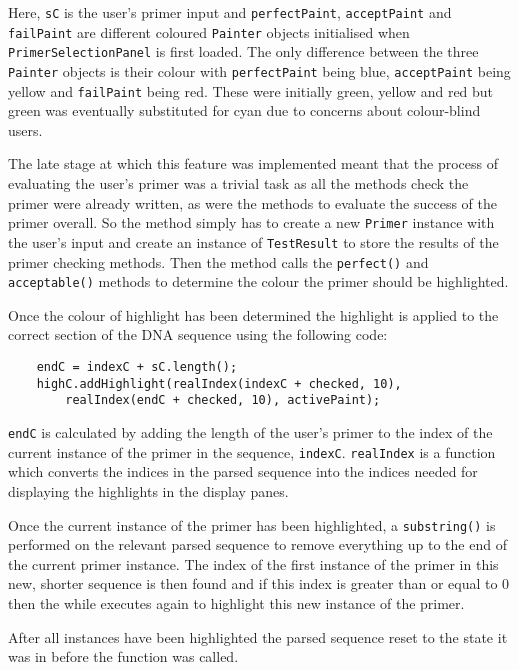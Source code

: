 Here, \texttt{sC} is the user's primer input and \texttt{perfectPaint},
\texttt{acceptPaint} and \texttt{failPaint} are different coloured
\texttt{Painter} objects initialised when \texttt{PrimerSelectionPanel}
is first loaded. The only difference between the three \texttt{Painter}
objects is their colour with \texttt{perfectPaint} being blue,
\texttt{acceptPaint} being yellow and \texttt{failPaint} being red.
These were initially green, yellow and red but green was eventually
substituted for cyan due to concerns about colour-blind users.

The late stage at which this feature was implemented meant that the
process of evaluating the user's primer was a trivial task as all the
methods check the primer were already written, as were the methods to
evaluate the success of the primer overall. So the method simply has to
create a new \texttt{Primer} instance with the user's input and create
an instance of \texttt{TestResult} to store the results of the primer
checking methods. Then the method calls the \texttt{perfect()} and
\texttt{acceptable()} methods to determine the colour the primer should
be highlighted.

Once the colour of highlight has been determined the highlight is
applied to the correct section of the DNA sequence using the following
code:

\begin{lstlisting}
    endC = indexC + sC.length();
    highC.addHighlight(realIndex(indexC + checked, 10),
        realIndex(endC + checked, 10), activePaint);
\end{lstlisting}

\texttt{endC} is calculated by adding the length of the user's primer to
the index of the current instance of the primer in the sequence, 
\texttt{indexC}. \texttt{realIndex} is a function which converts the
indices in the parsed sequence into the indices needed for displaying
the highlights in the display panes.

Once the current instance of the primer has been highlighted, a 
\texttt{substring()} is performed on the relevant parsed sequence to
remove everything up to the end of the current primer instance. The
index of the first instance of the primer in this new, shorter sequence
is then found and if this index is greater than or equal to 0 then the
while executes again to highlight this new instance of the primer.

After all instances have been highlighted the parsed sequence reset to
the state it was in before the function was called.











